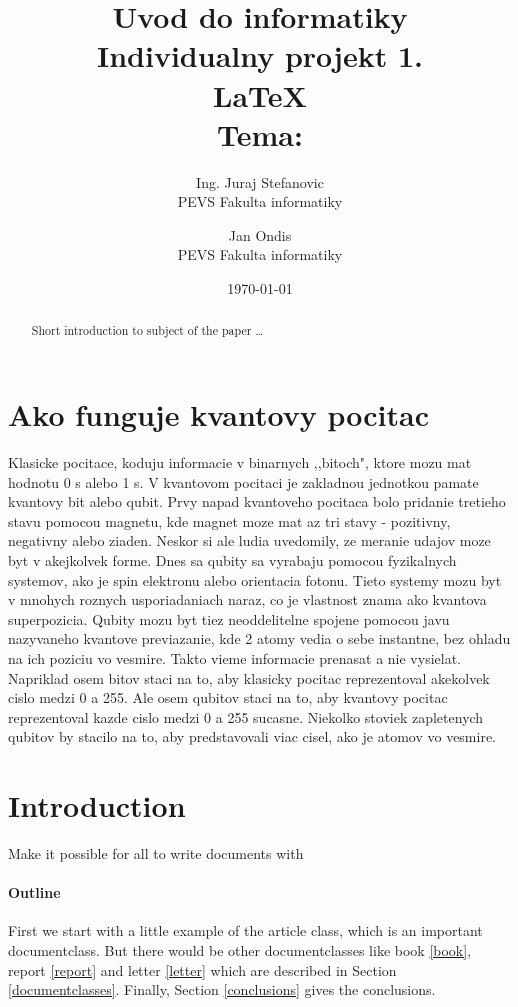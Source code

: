 \documentclass{article}
\title{Uvod do informatiky\\
\bigbreak
\bigbreak
\bigbreak
\bigbreak
\bigbreak
\bigbreak
\bigbreak
\bigbreak
\bigbreak
\bigbreak
\bigbreak
\bigbreak
\bigbreak
\bigbreak
\bigbreak
\bigbreak
\bigbreak
\bigbreak
  Individualny projekt 1.
  \\\LaTeX{} \\
  Tema:
\bigbreak
\bigbreak
\bigbreak
\bigbreak
\bigbreak
\bigbreak
\bigbreak
\bigbreak
\bigbreak
\bigbreak
\bigbreak
\bigbreak
\bigbreak
\bigbreak
\bigbreak
\bigbreak
}
\author{Ing. Juraj Stefanovic  \\
	PEVS Fakulta informatiky  \\
	\and
	Jan Ondis \\
	PEVS Fakulta informatiky \\
	}
\date{\today
}
\begin{document}
\maketitle

\section{Ako funguje kvantovy pocitac}\bigbreak
Klasicke pocitace, koduju informacie v binarnych ,,bitoch", ktore mozu mat hodnotu 0 s alebo 1 s. V kvantovom pocitaci je zakladnou jednotkou pamate kvantovy bit alebo qubit.
\bigbreak
Prvy napad kvantoveho pocitaca bolo pridanie tretieho stavu pomocou magnetu, kde magnet moze mat az tri stavy - pozitivny, negativny alebo ziaden. Neskor si ale ludia uvedomily, ze meranie udajov moze byt v akejkolvek forme. Dnes sa qubity sa vyrabaju pomocou fyzikalnych systemov, ako je spin elektronu alebo orientacia fotonu. Tieto systemy mozu byt v mnohych roznych usporiadaniach naraz, co je vlastnost znama ako kvantova superpozicia. Qubity mozu byt tiez neoddelitelne spojene pomocou javu nazyvaneho kvantove previazanie, kde 2 atomy vedia o sebe instantne, bez ohladu na ich poziciu vo vesmire. Takto vieme informacie prenasat a nie vysielat.
\bigbreak
Napriklad osem bitov staci na to, aby klasicky pocitac reprezentoval akekolvek cislo medzi 0 a 255. Ale osem qubitov staci na to, aby kvantovy pocitac reprezentoval kazde cislo medzi 0 a 255 sucasne. Niekolko stoviek zapletenych qubitov by stacilo na to, aby predstavovali viac cisel, ako je atomov vo vesmire.


\section{Introduction}
Make it possible for all to write documents with

\begin{abstract}
Short introduction to subject of the paper \ldots
\end{abstract}

\paragraph{Outline}
First we start with a little example of the article class, which is an
important documentclass. But there would be other documentclasses like
book \ref{book}, report \ref{report} and letter \ref{letter} which are
described in Section \ref{documentclasses}. Finally, Section
\ref{conclusions} gives the conclusions.
\end{document}
